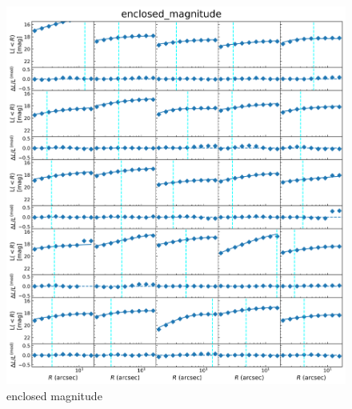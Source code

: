 \documentclass[fleqn,usenatbib]{mnras}
\begin{document}
\begin{figure}
    \centering
    \includegraphics[width=0.8\linewidth]{figure/enclosed_mag.png}
    \caption{enclosed magnitude}
    \label{fig:enclosed_magnitude}
\end{figure}
\end{document}
